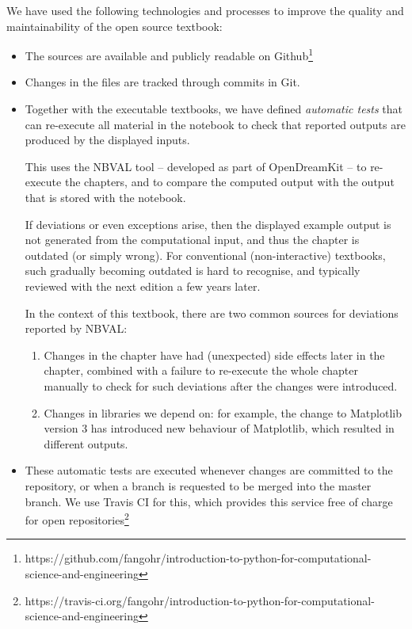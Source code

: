\documentclass{deliverablereport}
\begin{document}
We have used the following technologies and processes to improve the
quality and maintainability of the open source textbook:
\begin{itemize}
  
\item The sources are available and publicly readable on
  Github\footnote{https://github.com/fangohr/introduction-to-python-for-computational-science-and-engineering}
\item Changes in the files are tracked through commits in Git.
\item Together with the executable textbooks, we have defined
  \emph{automatic tests} that can re-execute all material in the
  notebook to check that reported outputs are produced by the
  displayed inputs.

  This uses the NBVAL tool -- developed as part of OpenDreamKit -- to
  re-execute the chapters, and to compare the computed output with the
  output that is stored with the notebook.

  If deviations or even exceptions arise, then the displayed example
  output is not generated from the computational input, and thus the
  chapter is outdated (or simply wrong). For conventional
  (non-interactive) textbooks, such gradually becoming outdated is
  hard to recognise, and typically reviewed with the next edition a
  few years later.

  In the context of this textbook, there are two common sources for
  deviations reported by NBVAL:
  \begin{enumerate}
  \item Changes in the chapter have had (unexpected) side effects
    later in the chapter, combined with a failure to re-execute the
    whole chapter manually to check for such deviations after the
    changes were introduced.
  \item Changes in libraries we depend on: for example, the change to
    Matplotlib version 3 has introduced new behaviour of Matplotlib,
    which resulted in different outputs.
    \end{enumerate}

\item These automatic tests are executed whenever changes are
  committed to the repository, or when a branch is requested to be
  merged into the master branch. We use Travis CI for this, which
  provides this service free of charge for open repositories\footnote{
  https://travis-ci.org/fangohr/introduction-to-python-for-computational-science-and-engineering}


\end{itemize}
\end{document}
